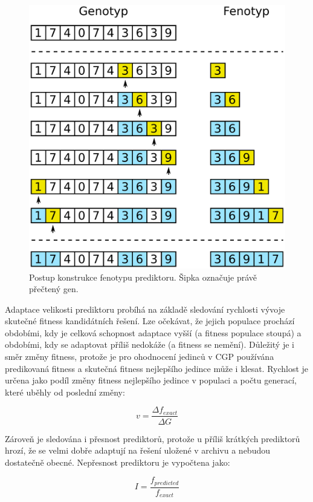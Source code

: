 \documentclass[fleqn,11pt]{ExcelAtFIT} %
\begin{document}
\begin{figure}[h]
    \centering\includegraphics[width=0.85\linewidth]{images/phenotype.pdf}
    \caption{Postup konstrukce fenotypu prediktoru. Šipka označuje právě přečtený gen.}
    \label{fig:PhenotypeContruction}
\end{figure}

Adaptace velikosti prediktoru probíhá na základě sledování rychlosti vývoje skutečné fitness kandidátních řešení. Lze očekávat, že jejich populace prochází obdobími, kdy je celková schopnost adaptace vyšší (a fitness populace stoupá) a obdobími, kdy se adaptovat příliš nedokáže (a fitness se nemění). Důležitý je i směr změny fitness, protože je pro ohodnocení jedinců v CGP používána predikovaná fitness a skutečná fitness nejlepšího jedince může i klesat. Rychlost je určena jako podíl změny fitness nejlepšího jedince v populaci a počtu generací, které uběhly od poslední změny:

\begin{equation}
    \label{eq:velocity}
    v = \frac{\Delta{}f_{\mathit{exact}}}{\Delta{}G}
\end{equation}

Zároveň je sledována i přesnost prediktorů, protože u příliš krátkých prediktorů hrozí, že se velmi dobře adaptují na řešení uložené v archivu a nebudou dostatečně obecné. Nepřesnost prediktoru je vypočtena jako:

\begin{equation}
    \mathit{I} = \frac{f_{\mathit{predicted}}}{f_{\mathit{exact}}}
\end{equation}
\end{document}
